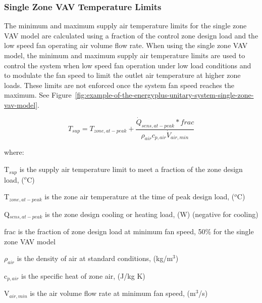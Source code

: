 \subsubsection{Single Zone VAV Temperature Limits}\label{single-zone-vav-temperature-limits}

The minimum and maximum supply air temperature limits for the single zone VAV model are calculated using a fraction of the control zone design load and the low speed fan operating air volume flow rate. When using the single zone VAV model, the minimum and maximum supply air temperature limits are used to control the system when low speed fan operation under low load conditions and to modulate the fan speed to limit the outlet air temperature at higher zone loads. These limits are not enforced once the system fan speed reaches the maximum. See Figure~\ref{fig:example-of-the-energyplus-unitary-system-single-zone-vav-model}.

\begin{equation}
T_{sup} = T_{zone,at-peak}+\frac{\dot{Q}_{sens,at-peak} * frac}{\rho_{air}c_{p,air}\dot{V}_{air,min}}
\end{equation}

where:

T\(_{sup}\) is the supply air temperature limit to meet a fraction of the zone design load, (\(^{o}\)C)

T\(_{zone,at-peak}\) is the zone air temperature at the time of peak design load, (\(^{o}\)C)

Q\(_{sens,at-peak}\) is the zone design cooling or heating load, (W) (negative for cooling)

frac is the fraction of zone design load at minimum fan speed, 50\% for the single zone VAV model

\(\rho_{air}\) is the density of air at standard conditions, (kg/m\(^{3}\))

c\(_{p,air}\) is the specific heat of zone air, (J/kg K)

V\(_{air,min}\) is the air volume flow rate at minimum fan speed, (m\(^{3}\)/s)
